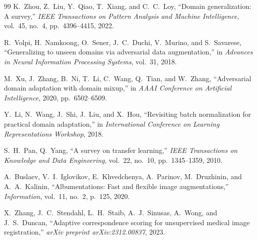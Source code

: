 \documentclass[12pt,a4paper]{article}
\begin{document}
\begin{thebibliography}{99}
K.~Zhou, Z.~Liu, Y.~Qiao, T.~Xiang, and C.~C.~Loy, ``Domain generalization: A survey,'' \textit{IEEE Transactions on Pattern Analysis and Machine Intelligence}, vol.~45, no.~4, pp.~4396--4415, 2022.

R.~Volpi, H.~Namkoong, O.~Sener, J.~C.~Duchi, V.~Murino, and S.~Savarese, ``Generalizing to unseen domains via adversarial data augmentation,'' in \textit{Advances in Neural Information Processing Systems}, vol.~31, 2018.

M.~Xu, J.~Zhang, B.~Ni, T.~Li, C.~Wang, Q.~Tian, and W.~Zhang, ``Adversarial domain adaptation with domain mixup,'' in \textit{AAAI Conference on Artificial Intelligence}, 2020, pp.~6502--6509.

Y.~Li, N.~Wang, J.~Shi, J.~Liu, and X.~Hou, ``Revisiting batch normalization for practical domain adaptation,'' in \textit{International Conference on Learning Representations Workshop}, 2018.

S.~H.~Pan, Q.~Yang, ``A survey on transfer learning,'' \textit{IEEE Transactions on Knowledge and Data Engineering}, vol.~22, no.~10, pp.~1345--1359, 2010.

A.~Buslaev, V.~I.~Iglovikov, E.~Khvedchenya, A.~Parinov, M.~Druzhinin, and A.~A.~Kalinin, ``Albumentations: Fast and flexible image augmentations,'' \textit{Information}, vol.~11, no.~2, p.~125, 2020.

X.~Zhang, J.~C.~Stendahl, L.~H.~Staib, A.~J.~Sinusas, A.~Wong, and J.~S.~Duncan, ``Adaptive correspondence scoring for unsupervised medical image registration,'' \textit{arXiv preprint arXiv:2312.00837}, 2023.

\end{thebibliography}
\end{document}
